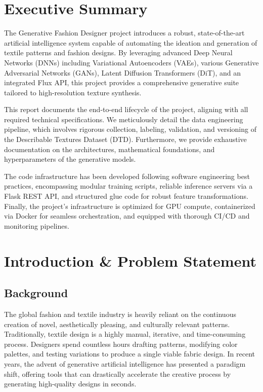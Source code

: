 \documentclass[12pt,a4paper]{article}
\begin{document}
\section{Executive Summary}

The Generative Fashion Designer project introduces a robust, state-of-the-art artificial intelligence system capable of automating the ideation and generation of textile patterns and fashion designs. By leveraging advanced Deep Neural Networks (DNNs) including Variational Autoencoders (VAEs), various Generative Adversarial Networks (GANs), Latent Diffusion Transformers (DiT), and an integrated Flux API, this project provides a comprehensive generative suite tailored to high-resolution texture synthesis.

This report documents the end-to-end lifecycle of the project, aligning with all required technical specifications. We meticulously detail the data engineering pipeline, which involves rigorous collection, labeling, validation, and versioning of the Describable Textures Dataset (DTD). Furthermore, we provide exhaustive documentation on the architectures, mathematical foundations, and hyperparameters of the generative models.

The code infrastructure has been developed following software engineering best practices, encompassing modular training scripts, reliable inference servers via a Flask REST API, and structured glue code for robust feature transformations. Finally, the project’s infrastructure is optimized for GPU compute, containerized via Docker for seamless orchestration, and equipped with thorough CI/CD and monitoring pipelines.

\section{Introduction \& Problem Statement}

\subsection{Background}
The global fashion and textile industry is heavily reliant on the continuous creation of novel, aesthetically pleasing, and culturally relevant patterns. Traditionally, textile design is a highly manual, iterative, and time-consuming process. Designers spend countless hours drafting patterns, modifying color palettes, and testing variations to produce a single viable fabric design. In recent years, the advent of generative artificial intelligence has presented a paradigm shift, offering tools that can drastically accelerate the creative process by generating high-quality designs in seconds.
\end{document}
